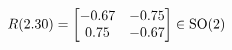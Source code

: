 \documentclass[preview]{standalone}
\begin{document}
\begin{align*}
\special{dvisvgm:raw <g id='unique000'>}R(2.30) = \begin{bmatrix} -0.67 & -0.75 \\ 0.75 & -0.67 \end{bmatrix} \in \text{SO}(2)\special{dvisvgm:raw </g>}
\end{align*}
\end{document}

